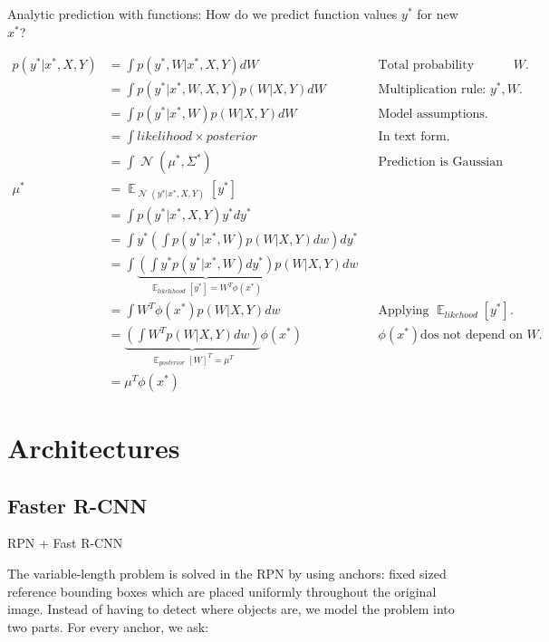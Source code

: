 \documentclass{article}
\DeclareMathOperator{\Gaussian}{\mathcal{N}}
\DeclareMathOperator{\E}{\mathbb{E}}
\begin{document}
Analytic prediction with functions: How do we predict function values $y^*$ for new $x^*$?

\begin{align*}
    p(y^*|x^*,X,Y) 
    &= \int p(y^*,W|x^*,X,Y) dW && \text{Total probability theorem: $W$.} \\
    &= \int p(y^*|x^*,W,X,Y) p(W|X,Y) dW && \text{Multiplication rule: $y^*,W$.} \\
    &= \int p(y^*|x^*,W) p(W|X,Y) dW && \text{Model assumptions.} \\
    &= \int likelihood \times posterior && \text{In text form.} \\
    &= \int \Gaussian(\mu^*,\Sigma^*) && \text{Prediction is Gaussian because Likelihood and posterior are Gaussian.} \\
    \mu^* &= \E_{\Gaussian(y^*|x^*,X,Y)}[y^*] \\
    &= \int p(y^*|x^*,X,Y) y^* dy^* \\
    &= \int y^* \left( \int p(y^*|x^*,W) p(W|X,Y) dw \right) dy^* \\
    &= \int \underbrace{\left( \int y^* p(y^*|x^*,W) dy^* \right)}_{\E_{likelihood}[y^*]=W^T\phi(x^*)} p(W|X,Y) dw \\
    &= \int W^T\phi(x^*) p(W|X,Y) dw && \text{Applying $\E_{likehood}[y^*]$.} \\
    &= \underbrace{\left( \int W^T p(W|X,Y) dw \right)}_{\E_{posterior}[W]^T=\mu^T} \phi(x^*) && \phi(x^*) \text{dos not depend on $W$.} \\
    &= \mu^T \phi(x^*)
\end{align*}

\section{Architectures}

\subsection{Faster R-CNN}

RPN + Fast R-CNN

The variable-length problem is solved in the RPN by using anchors: fixed sized reference bounding boxes which are placed uniformly throughout the original image. 
Instead of having to detect where objects are, we model the problem into two parts. For every anchor, we ask:
\end{document}
